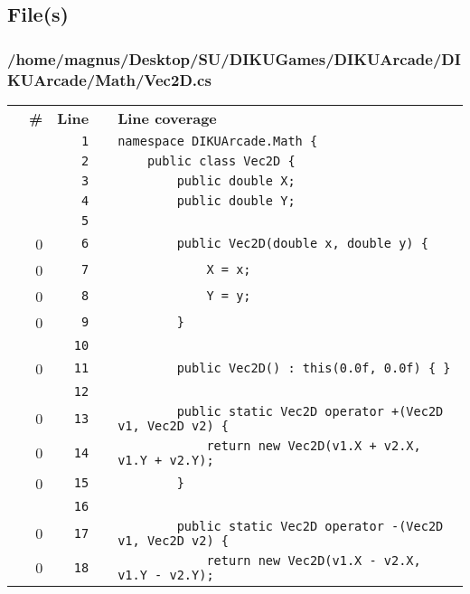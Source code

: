 \documentclass[a4paper,landscape,10pt]{article}
\begin{document}
\subsection{File(s)}
\subsubsection{/home/magnus/Desktop/SU/DIKUGames/DIKUArcade/DIKUArcade/Math/Vec2D.cs}
\begin{longtable}[l]{lrrll}
\textbf{} & \textbf{\#} & \textbf{Line} & \textbf{} & \textbf{Line coverage}\\
\cellcolor{gray} &  & \verb~1~ & & \verb~namespace DIKUArcade.Math {~\\
\cellcolor{gray} &  & \verb~2~ & & \verb~    public class Vec2D {~\\
\cellcolor{gray} &  & \verb~3~ & & \verb~        public double X;~\\
\cellcolor{gray} &  & \verb~4~ & & \verb~        public double Y;~\\
\cellcolor{gray} &  & \verb~5~ & & \verb~~\\
\cellcolor{red} & 0 & \verb~6~ & & \verb~        public Vec2D(double x, double y) {~\\
\cellcolor{red} & 0 & \verb~7~ & & \verb~            X = x;~\\
\cellcolor{red} & 0 & \verb~8~ & & \verb~            Y = y;~\\
\cellcolor{red} & 0 & \verb~9~ & & \verb~        }~\\
\cellcolor{gray} &  & \verb~10~ & & \verb~~\\
\cellcolor{red} & 0 & \verb~11~ & & \verb~        public Vec2D() : this(0.0f, 0.0f) { }~\\
\cellcolor{gray} &  & \verb~12~ & & \verb~~\\
\cellcolor{red} & 0 & \verb~13~ & & \verb~        public static Vec2D operator +(Vec2D v1, Vec2D v2) {~\\
\cellcolor{red} & 0 & \verb~14~ & & \verb~            return new Vec2D(v1.X + v2.X, v1.Y + v2.Y);~\\
\cellcolor{red} & 0 & \verb~15~ & & \verb~        }~\\
\cellcolor{gray} &  & \verb~16~ & & \verb~~\\
\cellcolor{red} & 0 & \verb~17~ & & \verb~        public static Vec2D operator -(Vec2D v1, Vec2D v2) {~\\
\cellcolor{red} & 0 & \verb~18~ & & \verb~            return new Vec2D(v1.X - v2.X, v1.Y - v2.Y);~\\

\end{longtable}
\end{document}
